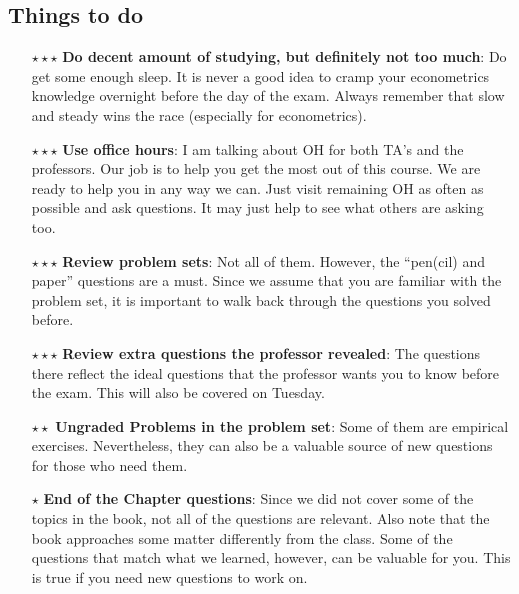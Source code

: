 \documentclass[12pt]{article}
\theoremstyle{definition}
\theoremstyle{property}
\theoremstyle{assumption}
\theoremstyle{example}
\theoremstyle{comment}
\begin{document}
\subsection{Things to do}
\begin{itemize}
\item[$\star\star\star$] \textbf{Do decent amount of studying, but definitely not too much}: Do get some enough sleep. It is never a good idea to cramp your econometrics knowledge overnight before the day of the exam. Always remember that slow and steady wins the race (especially for econometrics). 
\item[$\star\star\star$] \textbf{Use office hours}: I am talking about OH for both TA's and the professors. Our job is to help you get the most out of this course. We  are ready to help you in any way we can. Just visit remaining OH as often as possible and ask questions. It may just help to see what others are asking too.
\item[$\star\star\star$]\textbf{Review problem sets}: Not all of them. However, the ``pen(cil) and paper'' questions are a must. Since we assume that you are familiar with the problem set, it is important to walk back through the questions you solved before. 

\item[$\star\star\star$]\textbf{Review extra questions the professor revealed}: The questions there reflect the ideal questions that the professor wants you to know before the exam. This will also be covered on Tuesday.

\item[$\star\star$] \textbf{Ungraded Problems in the problem set}: Some of them are empirical exercises. Nevertheless, they can also be a valuable source of new questions for those who need them. 
\item[$\star$]\textbf{End of the Chapter questions}: Since we did not cover some of the topics in the book, not all of the questions are relevant. Also note that the book approaches some matter differently from the class. Some of the questions that match what we learned, however, can be valuable for you. This is true if you need new questions to work on. 
\end{itemize}



\end{document}
